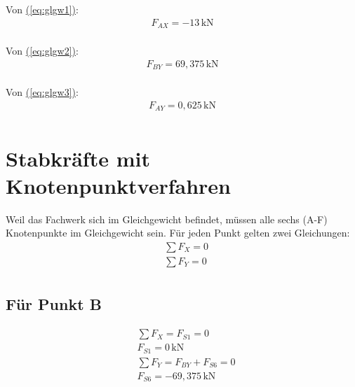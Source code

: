 \documentclass[fleqn,12pt]{article}
\begin{document}
Von \hyperref[eq:glgw1]{(\ref*{eq:glgw1})}:
\begin{align*}
  \boxed{F_{AX} = -13\,\text{kN}}\\
\end{align*}

Von \hyperref[eq:glgw2]{(\ref*{eq:glgw2})}:
\begin{align*}
  \boxed{F_{BY} = 69,375\,\text{kN}}\\
\end{align*}

Von \hyperref[eq:glgw3]{(\ref*{eq:glgw3})}:
\begin{align*}
  \boxed{F_{AY} = 0,625\,\text{kN}}\\
\end{align*}

\begin{minipage}{\textwidth}
  \section{Stabkräfte mit Knotenpunktverfahren}
  \label{sec:Knotenpunktverfahren}

  Weil das Fachwerk sich im Gleichgewicht befindet, müssen alle sechs (A-F) Knotenpunkte im Gleichgewicht sein. Für jeden Punkt gelten zwei Gleichungen:
  \setcounter{equation}{0}
  \begin{align}
    &\sum F_X = 0 \\
    &\sum F_Y = 0\\
  \end{align}

  \subsection{Für Punkt B}
  \begin{figure}[H]
    \centering
  \end{figure}
  \begin{align*}
    &\sum F_X = F_{S1} = 0\\
    &\boxed{F_{S1} = 0\,\text{kN}}\\
    &\sum F_Y = F_{BY} + F_{S6} = 0 \\
    &\boxed{F_{S6} = -69{,}375\,\text{kN}}\\
  \end{align*}
\end{minipage}
\end{document}
